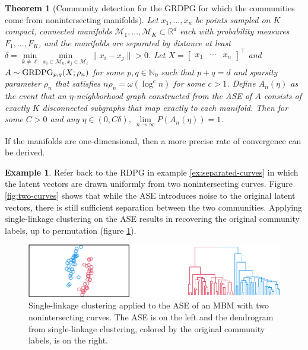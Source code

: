 \documentclass[
  11pt,
]{article}
\newtheorem{theorem}{Theorem}[section]
\theoremstyle{definition}
\theoremstyle{definition}
\newtheorem{example}{Example}[section]
\theoremstyle{definition}
\theoremstyle{definition}
\theoremstyle{remark}
\begin{document}
\begin{theorem}[Community detection for the GRDPG for which the communities come from nonintersecting manifolds]
\label{theorem:nonintersect-grdpg}
Let $x_1, ..., x_n$ be points sampled on $K$ compact, connected manifolds $\mathcal{M}_1, ..., \mathcal{M}_K \subset \mathbb{R}^d$ each with probability measures $F_1, ..., F_K$, and the manifolds are separated by distance at least $\delta = \min\limits_{k \neq \ell} \min\limits_{x_i \in \mathcal{M}_k, x_j \in \mathcal{M}_\ell} \| x_i - x_j \| > 0$. 
Let $X = \begin{bmatrix} x_1 & \cdots & x_n \end{bmatrix}^\top$ and $A \sim \mathrm{GRDPG}_{p,q}(X; \rho_n)$ for some $p, q \in \mathbb{N}_0$ such that $p + q = d$ and sparsity parameter $\rho_n$ that satisfies $n \rho_n = \omega(\log^c n)$ for some $c > 1$. 
Define $A_n(\eta)$ as the event that an $\eta$-neighborhood graph constructed from the ASE of $A$ consists of exactly $K$ disconnected subgraphs that map exactly to each manifold. 
Then for some $C > 0$ and any $\eta \in (0, C \delta)$, $\lim\limits_{n \to \infty} P(A_n(\eta)) = 1$. 
\end{theorem}

If the manifolds are one-dimensional, then a more precise rate of convergence can be derived.

\begin{example}
\label{ex:separated-curves-2}
Refer back to the RDPG in example \ref{ex:separated-curves} in which the latent vectors are drawn uniformly from two nonintersecting curves. 
Figure \ref{fig:two-curves} shows that while the ASE introduces noise to the original latent vectors, there is still sufficient separation between the two communities. 
Applying single-linkage clustering on the ASE results in recovering the original community labels, up to permutation (figure \ref{fig:two-curves-2}). 

\begin{figure}[H]

{\centering \includegraphics{draft_files/figure-latex/two-curves-2-1} 

}

\caption{Single-linkage clustering applied to the ASE of an MBM with two nonintersecting curves. The ASE is on the left and the dendrogram from single-linkage clustering, colored by the original community labels, is on the right.}\label{fig:two-curves-2}
\end{figure}
\end{example}
\end{document}
